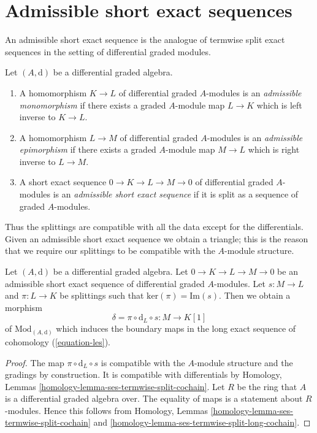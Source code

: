 \section{Admissible short exact sequences}
\label{section-admissible}

\noindent
An admissible short exact sequence is the analogue of termwise split exact
sequences in the setting of differential graded modules.

\begin{definition}
\label{definition-admissible-ses}
Let $(A, \text{d})$ be a differential graded algebra.
\begin{enumerate}
\item A homomorphism $K \to L$ of differential graded $A$-modules
is an {\it admissible monomorphism} if there exists a graded $A$-module
map $L \to K$ which is left inverse to $K \to L$.
\item A homomorphism $L \to M$ of differential graded $A$-modules
is an {\it admissible epimorphism} if there exists a graded $A$-module
map $M \to L$ which is right inverse to $L \to M$.
\item A short exact sequence $0 \to K \to L \to M \to 0$ of differential
graded $A$-modules is an {\it admissible short exact sequence}
if it is split as a sequence of graded $A$-modules.
\end{enumerate}
\end{definition}

\noindent
Thus the splittings are compatible with all the data except for
the differentials. Given an admissible short exact sequence we
obtain a triangle; this is the reason that we require our splittings
to be compatible with the $A$-module structure.

\begin{lemma}
\label{lemma-admissible-ses}
Let $(A, \text{d})$ be a differential graded algebra.
Let $0 \to K \to L \to M \to 0$ be an admissible short exact sequence
of differential graded $A$-modules. Let $s : M \to L$ and $\pi : L \to K$
be splittings such that $\text{ker}(\pi) = \text{Im}(s)$.
Then we obtain a morphism
$$
\delta = \pi \circ \text{d}_L \circ s : M \to K[1]
$$
of $\text{Mod}_{(A, \text{d})}$ which induces the boundary maps
in the long exact sequence of cohomology (\ref{equation-les}).
\end{lemma}

\begin{proof}
The map $\pi \circ \text{d}_L \circ s$ is compatible with the $A$-module
structure and the gradings by construction. It is compatible with
differentials by Homology, Lemmas
\ref{homology-lemma-ses-termwise-split-cochain}.
Let $R$ be the ring that $A$ is a differential graded algebra over.
The equality of maps is a statement about $R$-modules. Hence this
follows from Homology, Lemmas
\ref{homology-lemma-ses-termwise-split-cochain} and
\ref{homology-lemma-ses-termwise-split-long-cochain}.
\end{proof}

